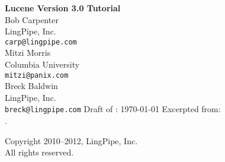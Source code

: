 \documentclass[10pt]{book}
\begin{document}
\frontmatter
\pagestyle{empty}
\vspace*{1in}
\noindent
{\Huge\bf Lucene Version 3.0 Tutorial}
\\[1in]
{\LARGE Bob Carpenter} 
\\[4pt] LingPipe, Inc.
\\[4pt] {\tt carp@lingpipe.com}
\\[16pt]
{\LARGE Mitzi Morris} 
\\[4pt] Columbia University
\\[4pt] {\tt mitzi@panix.com} 
\\[16pt]
{\LARGE Breck Baldwin} 
\\[4pt] LingPipe, Inc.
\\[4pt] {\tt breck@lingpipe.com} 
\hspace*{1in}
\vfill
{ }
\vfill
\noindent
Draft of : \today
\vfill
\noindent
Excerpted from:
\\[12pt]
\hspace*{-2pt}{\Large\it Text Processing with Java 6}.
\\[4pt]
%
\pagestyle{empty}
\clearpage
\hspace*{12pt}
\vfill
\begin{center}
{\small
Copyright 2010--2012, LingPipe, Inc.
\\
All rights reserved.}
\end{center}
\vfill
{}
\vfill
\pagestyle{empty}
\clearpage
\mainmatter
\pagestyle{fancy}

\end{document}
